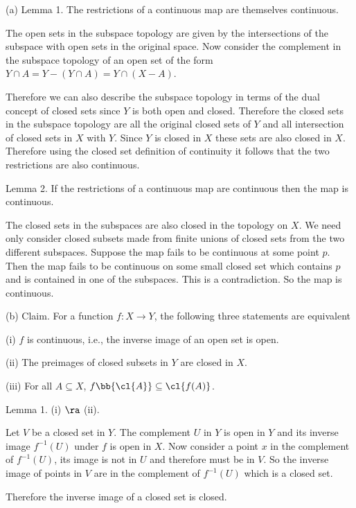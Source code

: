 \begin{solution}[\bf Solution.]
\ben
\item [(a)] Lemma 1. The restrictions of a continuous map are themselves continuous.

The open sets in the subspace topology are given by the intersections of the subspace with open sets in the original space. Now consider the complement in the subspace topology of an open set of the form $Y\cap A = Y-(Y\cap A) = Y\cap (X-A)$.

Therefore we can also describe the subspace topology in terms of the dual concept of closed sets since $Y$ is both open and closed. Therefore the closed sets in the subspace topology are all the original closed sets of $Y$ and all intersection of closed sets in $X$ with $Y$. Since $Y$ is closed in $X$ these sets are also closed in $X$. Therefore using the closed set definition of continuity it follows that the two restrictions are also continuous.

Lemma 2. If the restrictions of a continuous map are continuous then the map is continuous.

The closed sets in the subspaces are also closed in the topology on $X$. We need only consider closed subsets made from finite unions of closed sets from the two different subspaces. Suppose the map fails to be continuous at some point $p$. Then the map fails to be continuous on some small closed set which contains $p$ and is contained in one of the subspaces. This is a contradiction. So the map is continuous.

\item [(b)] Claim. For a function $f:X\to Y$, the following three statements are equivalent
\ben
\item [(i)] $f$ is continuous, i.e., the inverse image of an open set is open.
\item [(ii)] The preimages of closed subsets in $Y$ are closed in $X$.
\item [(iii)] For all $A\subseteq X$, $f\bb{\cl{A}} \subseteq \cl{f(A)}$.
\een

Lemma 1. (i) $\ra$ (ii).

Let $V$ be a closed set in $Y$. The complement $U$ in $Y$ is open in $Y$ and its inverse image $f^{-1}(U)$ under $f$ is open in $X$. Now consider a point $x$ in the complement of $f^{-1}(U)$, its image is not in $U$ and therefore must be in $V$. So the inverse image of points in $V$ are in the complement of $f^{-1}(U)$ which is a closed set.

Therefore the inverse image of a closed set is closed.


\end{solution}
